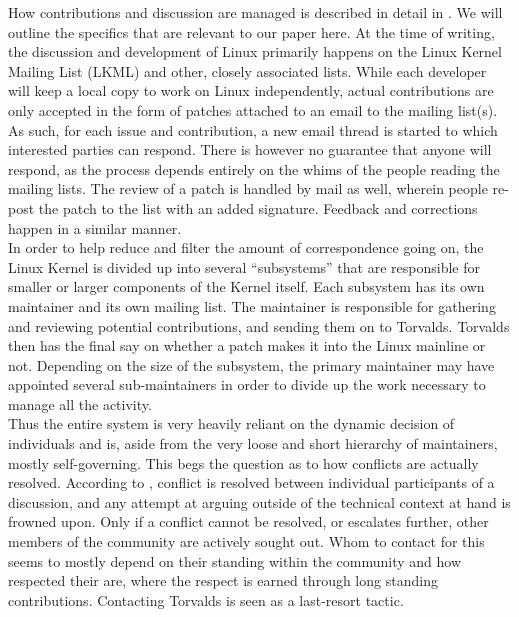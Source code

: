 How contributions and discussion are managed is described in detail in \citet{linux-participation}. We will outline the specifics that are relevant to our paper here. At the time of writing, the discussion and development of Linux primarily happens on the Linux Kernel Mailing List (LKML) and other, closely associated lists. While each developer will keep a local copy to work on Linux independently, actual contributions are only accepted in the form of patches attached to an email to the mailing list(s). As such, for each issue and contribution, a new email thread is started to which interested parties can respond. There is however no guarantee that anyone will respond, as the process depends entirely on the whims of the people reading the mailing lists. The review of a patch is handled by mail as well, wherein people re-post the patch to the list with an added signature. Feedback and corrections happen in a similar manner. \\

In order to help reduce and filter the amount of correspondence going on, the Linux Kernel is divided up into several ``subsystems'' that are responsible for smaller or larger components of the Kernel itself. Each subsystem has its own maintainer and its own mailing list. The maintainer is responsible for gathering and reviewing potential contributions, and sending them on to Torvalds. Torvalds then has the final say on whether a patch makes it into the Linux mainline or not. Depending on the size of the subsystem, the primary maintainer may have appointed several sub-maintainers in order to divide up the work necessary to manage all the activity. \\

Thus the entire system is very heavily reliant on the dynamic decision of individuals and is, aside from the very loose and short hierarchy of maintainers, mostly self-governing. This begs the question as to how conflicts are actually resolved. According to \citet{linux-participation}, conflict is resolved between individual participants of a discussion, and any attempt at arguing outside of the technical context at hand is frowned upon. Only if a conflict cannot be resolved, or escalates further, other members of the community are actively sought out. Whom to contact for this seems to mostly depend on their standing within the community and how respected their are, where the respect is earned through long standing contributions. Contacting Torvalds is seen as a last-resort tactic. \\

